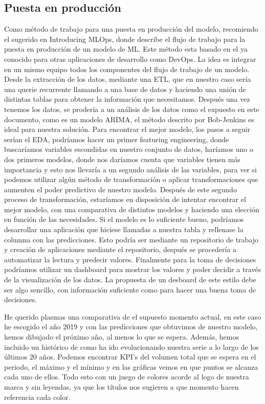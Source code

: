 \documentclass[11pt]{article}
\begin{document}
    \hypertarget{puesta-en-producciuxf3n}{%
\subsection{Puesta en producción}\label{puesta-en-producciuxf3n}}

    Como método de trabajo para una puesta en producción del modelo,
recomiendo el sugerido en Introducing MLOps, donde describe el flujo de
trabajo para la puesta en producción de un modelo de ML. Este método
esta basado en el ya conocido para otras aplicaciones de desarrollo como
DevOps. La idea es integrar en un mismo equipo todos los componentes del
flujo de trabajo de un modelo. Desde la extracción de los datos,
mediante una ETL, que en nuestro caso sería una querie recurrente
llamando a una base de datos y haciendo una unión de distintas tablas
para obtener la información que necesitamos. Después una vez tenemos los
datos, se prodería a un análisis de los datos como el expuesto en este
documento, como es un modelo ARIMA, el método descrito por Bob-Jenkins
es ideal para nuestra solución. Para encontrar el mejor modelo, los
pasos a seguir serían el EDA, podríamos hacer un primer featuring
engineering, donde buscaríamos variables escondidas en nuestro conjunto
de datos, haríamos uno o dos primeros modelos, donde nos daríamos cuenta
que variables tienen más importancia y esto nos llevaría a un segundo
análisis de las variables, para ver si podemos utilizar algún método de
transformación o aplicar transformaciones que aumenten el poder
predictivo de nuestro modelo. Después de este segundo proceso de
transformación, estaríamos en disposición de intentar encontrar el mejor
modelo, con una comparativa de distintos modelos y haciendo una elección
en función de las necesidades. Si el modelo es lo suficiente bueno,
podríamos desarrollar una aplicación que hiciese llamadas a nuestra
tabla y rellenase la columna con las predicciones. Esto podría ser
mediante un repositorio de trabajo y creación de aplicaciones mediante
el repositorio, después se procedería a automatizar la lectura y
predecir valores. Finalmente para la toma de decisiones podríamos
utilizar un dashboard para mostrar los valores y poder decidir a través
de la visualización de los datos. La propuesta de un desboard de este
estilo debe ser algo sencillo, con información suficiente como para
hacer una buena toma de decisiones.

    He querido plasmas una comparativa de el supuesto momento actual, en
este caso he escogido el año 2019 y con las predicciones que obtuvimos
de nuestro modelo, hemos dibujado el próximo año, al menos lo que se
espera. Además, hemos incluido un histórico de como ha ido evolucionando
nuestra serie a lo largo de los últimos 20 años. Podemos encontrar KPI's
del volumen total que se espera en el periodo, el máximo y el mínimo y
en las gráficas vemos en que puntos se alcanza cada uno de ellos. Todo
esto con un juego de colores acorde al logo de nuestra marca y sin
leyendas, ya que los títulos nos sugieren a que momento hacen referencia
cada color.
\end{document}
